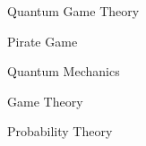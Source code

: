 \begin{keywords}
Quantum Game Theory

Pirate Game

Quantum Mechanics

Game Theory

Probability Theory
\end{keywords}
\clearpage
\thispagestyle{empty}
\cleardoublepage